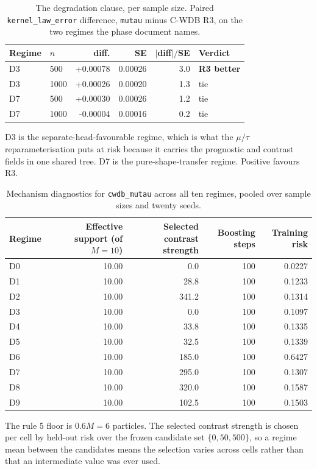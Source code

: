 \begin{table}[htbp]
\centering
\caption{The degradation clause, per sample size. Paired \texttt{kernel\_law\_error} difference, \texttt{mutau} minus C-WDB R3, on the two regimes the phase document names.}
\label{tab:p55s2-degradation}
\scriptsize
\begin{tabular}{@{}llrrrl@{}}
\toprule
Regime & $n$ & diff. & SE & $|$diff$|/$SE & Verdict \\
\midrule
D3 & 500 & +0.00078 & 0.00026 & 3.0 & \textbf{R3 better} \\
D3 & 1000 & +0.00026 & 0.00020 & 1.3 & tie \\
D7 & 500 & +0.00030 & 0.00026 & 1.2 & tie \\
D7 & 1000 & -0.00004 & 0.00016 & 0.2 & tie \\
\bottomrule
\end{tabular}
\par\vspace{2pt}\parbox{0.9\textwidth}{\scriptsize D3 is the separate-head-favourable regime, which is what the $\mu/\tau$ reparameterisation puts at risk because it carries the prognostic and contrast fields in one shared tree. D7 is the pure-shape-transfer regime. Positive favours R3.}
\end{table}

\begin{table}[htbp]
\centering
\caption{Mechanism diagnostics for \texttt{cwdb\_mutau} across all ten regimes, pooled over sample sizes and twenty seeds.}
\label{tab:p55s2-diagnostics}
\scriptsize
\begin{tabular}{@{}lrrrr@{}}
\toprule
Regime & Effective support (of $M = 10$) & Selected contrast strength & Boosting steps & Training risk \\
\midrule
D0 & 10.00 & 0.0 & 100 & 0.0227 \\
D1 & 10.00 & 28.8 & 100 & 0.1233 \\
D2 & 10.00 & 341.2 & 100 & 0.1314 \\
D3 & 10.00 & 0.0 & 100 & 0.1097 \\
D4 & 10.00 & 33.8 & 100 & 0.1335 \\
D5 & 10.00 & 32.5 & 100 & 0.1339 \\
D6 & 10.00 & 185.0 & 100 & 0.6427 \\
D7 & 10.00 & 295.0 & 100 & 0.1307 \\
D8 & 10.00 & 320.0 & 100 & 0.1587 \\
D9 & 10.00 & 102.5 & 100 & 0.1503 \\
\bottomrule
\end{tabular}
\par\vspace{2pt}\parbox{0.9\textwidth}{\scriptsize The rule 5 floor is $0.6M = 6$ particles. The selected contrast strength is chosen per cell by held-out risk over the frozen candidate set $\{0, 50, 500\}$, so a regime mean between the candidates means the selection varies across cells rather than that an intermediate value was ever used.}
\end{table}

